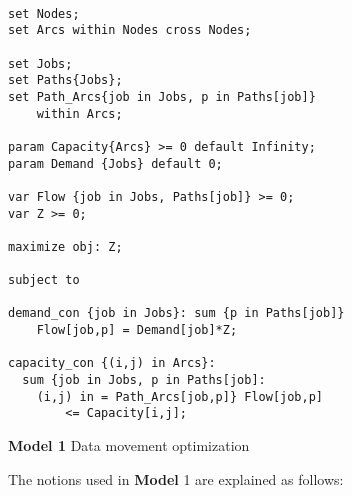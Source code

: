 \begin{algorithm}[!htbp]

\begingroup
\fontsize{9pt}{9pt}\selectfont

\begin{verbatim}

set Nodes;
set Arcs within Nodes cross Nodes;

set Jobs;
set Paths{Jobs};
set Path_Arcs{job in Jobs, p in Paths[job]} 
    within Arcs;

param Capacity{Arcs} >= 0 default Infinity;
param Demand {Jobs} default 0;

var Flow {job in Jobs, Paths[job]} >= 0;
var Z >= 0;

maximize obj: Z;

subject to

demand_con {job in Jobs}: sum {p in Paths[job]} 
	Flow[job,p] = Demand[job]*Z;

capacity_con {(i,j) in Arcs}:
  sum {job in Jobs, p in Paths[job]: 
    (i,j) in = Path_Arcs[job,p]} Flow[job,p] 
		<= Capacity[i,j];

\end{verbatim}

\endgroup

\caption*{\textbf{Model 1} Data movement optimization}
\label{mod:opt}

\end{algorithm}

The notions used in \textbf{Model} 1 are explained as follows:

